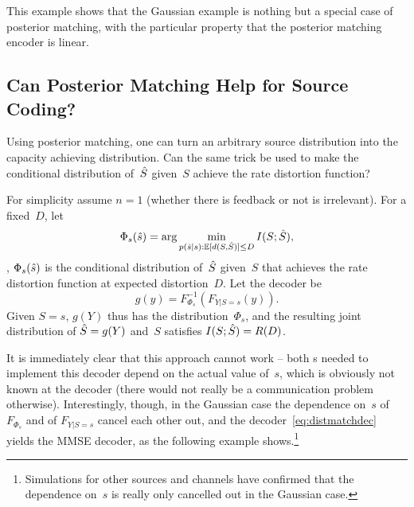 This example shows that the Gaussian example is nothing but a special case of
posterior matching, with the particular property that the posterior matching
encoder is linear.


\subsection{Can Posterior Matching Help for Source Coding?}

Using posterior matching,  one can turn an arbitrary source distribution into
the capacity achieving distribution. Can the same trick be used to make the
conditional distribution of~${\hat{S}}$ given~$S$ achieve the rate distortion
function? 

For simplicity assume $n = 1$ (whether there is feedback or not is irrelevant).
For a fixed~$D$, let
\begin{equation*}
  \Phi_s({\hat{s}}) = \arg\min_{p({\hat{s}}|s): \mathbb{E}[d(S,{\hat{S}})] \le D} I(S;{\hat{S}}),
\end{equation*}
\ie, $\Phi_s({\hat{s}})$ is the conditional distribution of~${\hat{S}}$ given~$S$ that
achieves the rate distortion function at expected distortion~$D$. Let the
decoder be
\begin{equation}
  \label{eq:distmatchdec}
  g(y) = F_{\Phi_s}^{-1}(F_{Y|S=s}(y)).
\end{equation}
Given $S = s$, $g(Y)$ thus has the distribution~$\Phi_s$, and the resulting
joint distribution of ${\hat{S}} = g(Y)$ and~$S$ satisfies $I(S;{\hat{S}}) = R(D)$. 

It is immediately clear that this approach cannot work -- both \cdf s needed to
implement this decoder depend on the actual value of~$s$, which is obviously not
known at the decoder (there would not really be a communication problem
otherwise). Interestingly, though, in the Gaussian case the dependence on~$s$ of
$F_{\Phi_s}$ and of $F_{Y|S=s}$ cancel each other out, and the
decoder~\eqref{eq:distmatchdec} yields the MMSE decoder, as the following
example shows.\footnote{Simulations for other sources and channels have
confirmed that the dependence on~$s$ is really only cancelled out in the
Gaussian case.}


